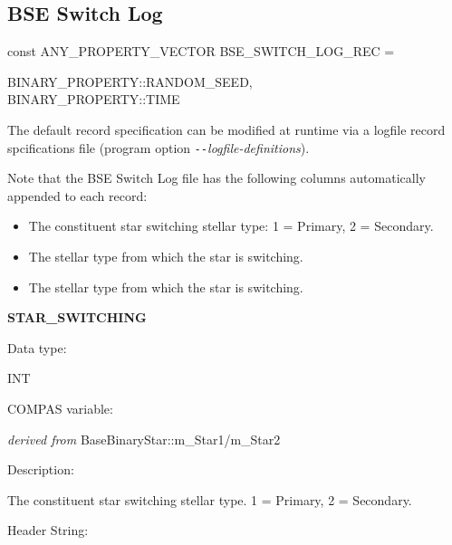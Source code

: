 \newpage
\subsection{BSE Switch Log}\label{sec:BSESwitchLog}

const ANY\_PROPERTY\_VECTOR BSE\_SWITCH\_LOG\_REC = \lcb

\hfill
\begin{minipage}{\dimexpr\textwidth-2em}
    BINARY\_PROPERTY::RANDOM\_SEED, \\
    BINARY\_PROPERTY::TIME
\end{minipage}
\par\rcb{;}

\bigskip
The default record specification can be modified at runtime via a logfile record spcifications file (program option \textit{\texttt{-{}-}logfile-definitions}).

Note that the BSE Switch Log file has the following columns automatically appended to each record:

\begin{itemize}
    \item{The constituent star switching stellar type: 1 = Primary, 2 = Secondary.}
    \item{The stellar type from which the star is switching.}
    \item{The stellar type from which the star is switching.}
\end{itemize}

\medskip
\begin{minipage}{\textwidth} %
    \textbf{STAR\_SWITCHING} \\
    \parskip 0pt
    \begin{minipage}[t][][b]{8.25em}Data type:\end{minipage}
    \begin{minipage}[t][][b]{\dimexpr\textwidth-8.75em}INT\end{minipage}\vfill
    \begin{minipage}[t][][b]{8.25em}COMPAS variable:\end{minipage}
    \begin{minipage}[t][][b]{\dimexpr\textwidth-8.75em}\textit{derived from }BaseBinaryStar::m\_Star1/m\_Star2\end{minipage}\vfill
    \begin{minipage}[t][][b]{8.25em}Description:\end{minipage}
    \begin{minipage}[t][][b]{\dimexpr\textwidth-8.75em}\raggedright{The constituent star switching stellar type. 1 = Primary, 2 = Secondary.}\end{minipage}\vfill
    \begin{minipage}[t][][b]{8.25em}Header String:\end{minipage}
    \begin{minipage}[t][][b]{\dimexpr\textwidth-8.75em}\raggedright{}\end{minipage}\vfill
\end{minipage}

